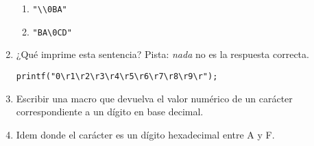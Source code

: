 \begin{enumerate}
\begin{enumerate}[label=\alph*.]
\item \lstinline{"\\0BA"}
\item \lstinline{"BA\0CD"}
	\end{enumerate}
\item ¿Qué imprime esta sentencia? Pista: \textit{nada} no es la respuesta correcta.
\begin{lstlisting}
printf("0\r1\r2\r3\r4\r5\r6\r7\r8\r9\r");
\end{lstlisting}
\item Escribir una macro que devuelva el valor numérico de un carácter correspondiente a un dígito en base decimal.
\item Idem donde el carácter es un dígito hexadecimal entre A y F.
\end{enumerate}
